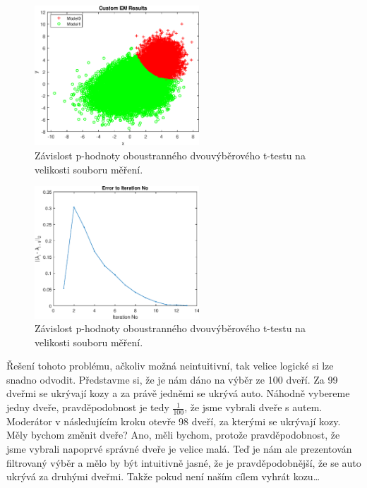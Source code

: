 \begin{figure}[htb]
    \centering
    \includegraphics[width=0.55\textwidth]{graphs/fig3.eps}
    \caption{Závislost p-hodnoty oboustranného dvouvýběrového t-testu na velikosti souboru měření.}
    \label{fig:result3}
\end{figure}
\FloatBarrier

\begin{figure}[htb]
    \centering
    \includegraphics[width=0.55\textwidth]{graphs/fig4.eps}
    \caption{Závislost p-hodnoty oboustranného dvouvýběrového t-testu na velikosti souboru měření.}
    \label{fig:result4}
\end{figure}
\FloatBarrier

Řešení tohoto problému, ačkoliv možná neintuitivní, tak velice logické si lze snadno odvodit.
Představme si, že je nám dáno na výběr ze 100 dveří.
Za 99 dveřmi se ukrývají kozy a za právě jedněmi se ukrývá auto.
Náhodně vybereme jedny dveře, pravděpodobnost je tedy \( \frac{1}{100} \), že jsme vybrali dveře s autem.
Moderátor v následujícím kroku otevře 98 dveří, za kterými se ukrývají kozy.
Měly bychom změnit dveře?
Ano, měli bychom, protože pravděpodobnost, že jsme vybrali napoprvé správné dveře je velice malá.
Teď je nám ale prezentován filtrovaný výběr a mělo by být intuitivně jasné, že je pravděpodobnější, že se auto ukrývá za druhými dveřmi.
Takže pokud není naším cílem vyhrát kozu\ldots

